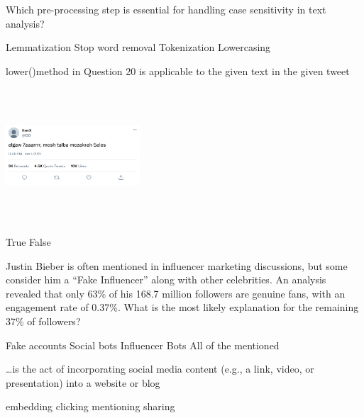 \documentclass[theme=sleek, randomorder, hidesidemenu]{webquiz}
\begin{document}
\begin{question}
  Which pre-processing step is essential for handling case sensitivity in text analysis?
  \begin{choice}[columns=2]
    \incorrect Lemmatization
    \incorrect Stop word removal
    \incorrect Tokenization
    \correct Lowercasing
  \end{choice}
\end{question}

\begin{question}
lower()method in Question 20 is applicable to the given text in the given tweet
  \begin{center}
    \includegraphics[height=50mm, width=50mm]{tweet.png}
  \end{center}
  \begin{choice}[columns=2]
    \incorrect True
    \correct False
  \end{choice}
\end{question}

\begin{question}
  Justin Bieber is often mentioned in influencer marketing discussions, but some consider him a ``Fake Influencer'' along with other celebrities. An analysis revealed that only 63\% of his 168.7 million followers are genuine fans, with an engagement rate of 0.37\%. What is the most likely explanation for the remaining 37\% of followers?

  \begin{choice}[columns=2]
    \incorrect Fake accounts
    \incorrect Social bots
    \incorrect Influencer Bots
    \correct All of the mentioned
  \end{choice}
\end{question}

\begin{question}
  \ldots is the act of incorporating social media content (e.g., a link, video, or presentation) into a website or blog
  \begin{choice}[columns=2]
    \correct embedding
    \incorrect clicking
    \incorrect mentioning
    \incorrect sharing
  \end{choice}
\end{question}
\end{document}
